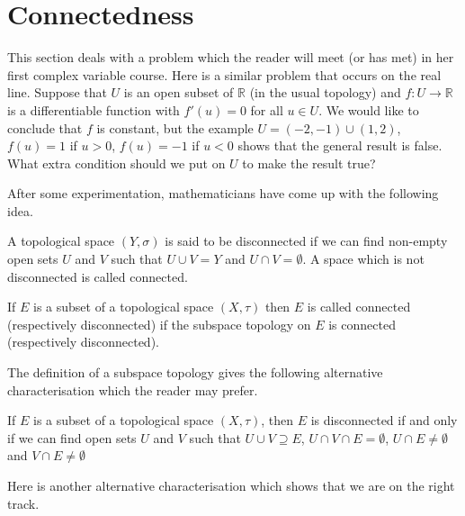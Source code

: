 























\section{Connectedness} This section deals with a problem
which the reader will meet (or has met) in her first
complex variable course. Here is a similar problem that
occurs on the real line. Suppose that $U$ is an open
subset of ${\mathbb R}$ (in the usual topology)
and $f:U\rightarrow {\mathbb R}$ is a differentiable function
with $f'(u)=0$ for all $u\in U$. We would like to
conclude that $f$ is constant, but the example
$U=(-2,-1)\cup (1,2)$, $f(u)=1$ if $u>0$,
$f(u)=-1$ if $u<0$ shows that the general result
is false. What extra condition should we put on $U$
to make the result true?

After some experimentation, mathematicians have come up
with the following idea.
\begin{definition}\label{D;disconnected}
A topological space $(Y,\sigma)$ is
said to be disconnected if we can find non-empty
open sets $U$ and $V$ such that $U\cup V=Y$
and $U\cap V=\emptyset$. A space which is not
disconnected is called connected.
\end{definition}
\begin{definition} If $E$ is a subset of a topological
space $(X,\tau)$ then $E$ is called connected (respectively
disconnected) if the subspace topology on $E$ is
connected (respectively
disconnected).

\end{definition}
The definition of a subspace topology gives the following
alternative characterisation which the reader may prefer.
\begin{lemma} If $E$ is a subset of a topological
space $(X,\tau)$, then $E$ is disconnected if
and only if we can find
open sets $U$ and $V$ such that $U\cup V\supseteq E$,
$U\cap V\cap E=\emptyset$, $U\cap E\neq\emptyset$
and $V\cap E\neq\emptyset$
\end{lemma}

Here is another alternative characterisation which
shows that we are on the right track.



